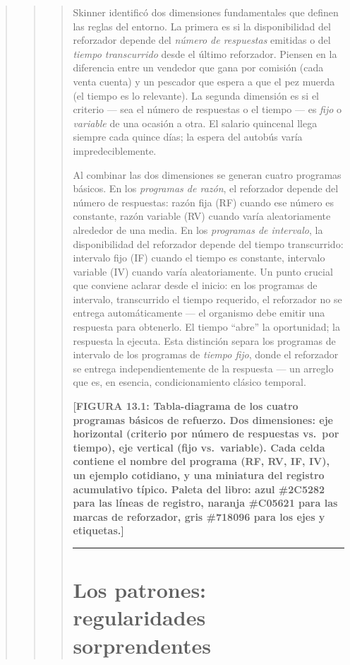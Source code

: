 \documentclass[
  letterpaper,
  DIV=11,
  numbers=noendperiod]{scrreprt}
\begin{document}
\begin{tcolorbox}[enhanced jigsaw, toprule=.15mm, arc=.35mm, colback=white, opacityback=0, colframe=quarto-callout-note-color-frame, breakable, rightrule=.15mm, left=2mm, leftrule=.75mm, bottomrule=.15mm]
\begin{quote}
\begin{quote}
\begin{quote}
Skinner identificó dos dimensiones fundamentales que definen las reglas
del entorno. La primera es si la disponibilidad del reforzador depende
del \emph{número de respuestas} emitidas o del \emph{tiempo
transcurrido} desde el último reforzador. Piensen en la diferencia entre
un vendedor que gana por comisión (cada venta cuenta) y un pescador que
espera a que el pez muerda (el tiempo es lo relevante). La segunda
dimensión es si el criterio --- sea el número de respuestas o el tiempo
--- es \emph{fijo} o \emph{variable} de una ocasión a otra. El salario
quincenal llega siempre cada quince días; la espera del autobús varía
impredeciblemente.

Al combinar las dos dimensiones se generan cuatro programas básicos. En
los \emph{programas de razón}, el reforzador depende del número de
respuestas: razón fija (RF) cuando ese número es constante, razón
variable (RV) cuando varía aleatoriamente alrededor de una media. En los
\emph{programas de intervalo}, la disponibilidad del reforzador depende
del tiempo transcurrido: intervalo fijo (IF) cuando el tiempo es
constante, intervalo variable (IV) cuando varía aleatoriamente. Un punto
crucial que conviene aclarar desde el inicio: en los programas de
intervalo, transcurrido el tiempo requerido, el reforzador no se entrega
automáticamente --- el organismo debe emitir una respuesta para
obtenerlo. El tiempo ``abre'' la oportunidad; la respuesta la ejecuta.
Esta distinción separa los programas de intervalo de los programas de
\emph{tiempo fijo}, donde el reforzador se entrega independientemente de
la respuesta --- un arreglo que es, en esencia, condicionamiento clásico
temporal.

\textbf{{[}FIGURA 13.1: Tabla-diagrama de los cuatro programas básicos
de refuerzo. Dos dimensiones: eje horizontal (criterio por número de
respuestas vs.~por tiempo), eje vertical (fijo vs.~variable). Cada celda
contiene el nombre del programa (RF, RV, IF, IV), un ejemplo cotidiano,
y una miniatura del registro acumulativo típico. Paleta del libro: azul
\#2C5282 para las líneas de registro, naranja \#C05621 para las marcas
de reforzador, gris \#718096 para los ejes y etiquetas.{]}}

\begin{center}\rule{0.5\linewidth}{0.5pt}\end{center}

\section{Los patrones: regularidades
sorprendentes}\label{los-patrones-regularidades-sorprendentes}


\end{quote}
\end{quote}
\end{quote}
\end{tcolorbox}
\end{document}
